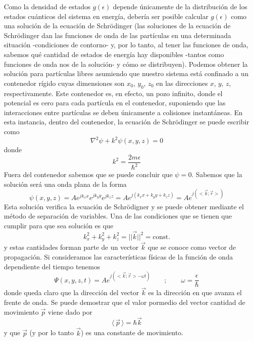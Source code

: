 \documentclass[12pt,a4paper]{article}
\def\e{{\epsilon}} %
\begin{document}
Como la densidad de estados $g(\e)$ depende únicamente de la distribución de los estados cuánticos del sistema en energía, debería ser posible calcular $g(\e)$ como una solución de la ecuación de Schrödinger (las soluciones de la ecuación de Schrödinger dan las funciones de onda de las partículas en una determinada situación -condiciones de contorno- y, por lo tanto, al tener las funciones de onda, sabemos qué cantidad de estados de energía hay disponibles -tantos como funciones de onda nos de la solución- y cómo se distribuyen). Podemos obtener la solución para partículas libres asumiendo que nuestro sistema está confinado a un contenedor rígido cuyas dimensiones son $x_{0}$, $y_{0}$, $z_{0}$ en las direcciones $x$, $y$, $z$, respectivamente. Este contenedor es, en efecto, un pozo infinito, donde el potencial es cero para cada partícula en el contenedor, suponiendo que las interacciones entre partículas se deben únicamente a colisiones instantáneas. En esta instancia, dentro del contenedor, la ecuación de Schrödinger se puede escribir como
\[ \nabla^{2} \psi + k^{2} \psi (x,y,z)=0 \]
donde
\[ k^{2}=\frac{2m\e}{\hbar^{2}} \]
Fuera del contenedor sabemos que se puede concluir que $\psi=0$. Sabemos que la solución será una onda plana de la forma
\[ \psi (x,y,z)=Ae^{jk_{x}x}e^{jk_{y}y}e^{jk_{z}z}=Ae^{j(k_{x}x+k_{y}y+k_{z}z)}=Ae^{j(<\vec{k};\vec{r}>)} \]
Esta solución verifica la ecuación de Schrödigner y se puede obtener mediante el método de separación de variables. Una de las condiciones que se tienen que cumplir para que sea solución es que
\[ k_{x}^{2}+k_{y}^{2}+k_{z}^{2}=|| \vec{k} ||^{2}=\textrm{const.} \]
y estas cantidades forman parte de un vector $\vec{k}$ que se conoce como vector de propagación. Si consideramos las características físicas de la función de onda dependiente del tiempo tenemos
\[ \Psi (x,y,z,t)=Ae^{j(<\vec{k};\vec{r}>-\omega t)} \qquad ; \qquad \omega = \frac{\e}{\hbar} \]
donde queda claro que la dirección del vector $\vec{k}$ es la dirección en que avanza el frente de onda. Se puede demostrar que el valor pormedio del vector cantidad de movimiento $\vec{p}$ viene dado por
\[ \langle \, \vec{p} \, \rangle=\hbar \vec{k} \]
y que $\vec{p}$ (y por lo tanto $\vec{k}$) es una constante de movimiento.
\end{document}
